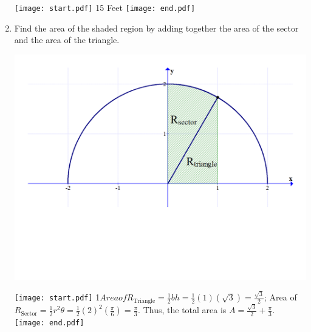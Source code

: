 \documentclass[12pt]{article}
\begin{document}
\begin{enumerate}
\texttt{[image: start.pdf]}
{15 Feet}
\texttt{[image: end.pdf]}


\item Find the area of the shaded region by adding together the area of the sector and the area of the triangle.

\begin{center}
\includegraphics[scale=0.35]{area2.pdf}
\end{center}

\texttt{[image: start.pdf]}
{{{1\linewidth}{$Area of R_{\text{Triangle}}=\frac{1}{2}bh=\frac{1}{2}(1)\left(\sqrt{3}\right)=\frac{\sqrt{3}}{2}$; Area of $R_{\text{Sector}}=\frac{1}{2}r^2\theta=\frac{1}{2}(2)^2\left(\frac{\pi}{6}\right)=\frac{\pi}{3}$.  Thus, the total area is $A= \frac{\sqrt{3}}{2}+\frac{\pi}{3}$.}}}
\texttt{[image: end.pdf]}


\end{enumerate}
\end{document}
